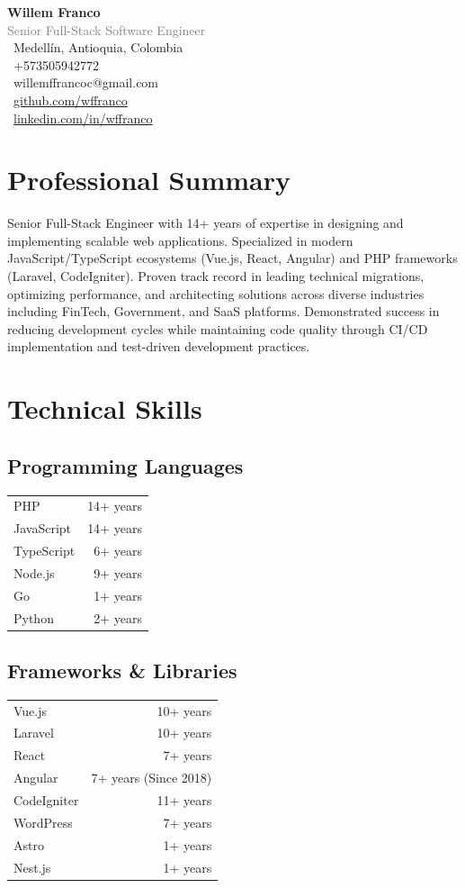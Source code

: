 \documentclass[11pt,a4paper]{article}
\newcommand{\skill}[2]{#1 & #2 \\}
\begin{document}
\begin{center}
  {\Huge\textbf{Willem Franco}}\\[0.3em]
  {\Large\textcolor{gray}{Senior Full-Stack Software Engineer}}\\[0.5em]
  \faMapMarker\ Medellín, Antioquia, Colombia \\
  \faPhone\ +573505942772 \\
  \faEnvelope\ willemffrancoc@gmail.com \\
  \faGithub\ \href{https://github.com/wffranco}{github.com/wffranco} \\
  \faLinkedin\ \href{https://linkedin.com/in/wffranco}{linkedin.com/in/wffranco}
\end{center}

\section*{Professional Summary}
Senior Full-Stack Engineer with 14+ years of expertise in designing and implementing scalable web applications. Specialized in modern JavaScript/TypeScript ecosystems (Vue.js, React, Angular) and PHP frameworks (Laravel, CodeIgniter). Proven track record in leading technical migrations, optimizing performance, and architecting solutions across diverse industries including FinTech, Government, and SaaS platforms. Demonstrated success in reducing development cycles while maintaining code quality through CI/CD implementation and test-driven development practices.

\section*{Technical Skills}

\subsection*{Programming Languages}
\begin{tabularx}{\textwidth}{X r}
\skill{PHP}{14+ years}
\skill{JavaScript}{14+ years}
\skill{TypeScript}{6+ years}
\skill{Node.js}{9+ years}
\skill{Go}{1+ years}
\skill{Python}{2+ years}
\end{tabularx}

\subsection*{Frameworks \& Libraries}
\begin{tabularx}{\textwidth}{X r}
\skill{Vue.js}{10+ years}
\skill{Laravel}{10+ years}
\skill{React}{7+ years}
\skill{Angular}{7+ years (Since 2018)}
\skill{CodeIgniter}{11+ years}
\skill{WordPress}{7+ years}
\skill{Astro}{1+ years}
\skill{Nest.js}{1+ years}
\end{tabularx}
\end{document}
